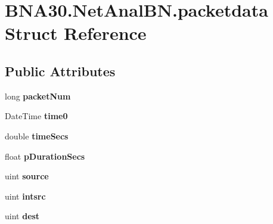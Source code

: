 \hypertarget{struct_b_n_a30_1_1_net_anal_b_n_1_1packetdata}{}\section{B\+N\+A30.\+Net\+Anal\+B\+N.\+packetdata Struct Reference}
\label{struct_b_n_a30_1_1_net_anal_b_n_1_1packetdata}
\subsection*{Public Attributes}
\begin{DoxyCompactItemize}
\item 
\mbox{\label{struct_b_n_a30_1_1_net_anal_b_n_1_1packetdata_a69e68c9039ce3662b36a29dbc50795de}} 
long {\bfseries packet\+Num}
\item 
\mbox{\label{struct_b_n_a30_1_1_net_anal_b_n_1_1packetdata_ae5517e3a1c2d11ba6e1f3b9f1eaeaa0a}} 
Date\+Time {\bfseries time0}
\item 
\mbox{\label{struct_b_n_a30_1_1_net_anal_b_n_1_1packetdata_a3963604c38394f46acf5b608993a3bf5}} 
double {\bfseries time\+Secs}
\item 
\mbox{\label{struct_b_n_a30_1_1_net_anal_b_n_1_1packetdata_ad8cf145e1fefbb8f55be2e3c54c10639}} 
float {\bfseries p\+Duration\+Secs}
\item 
\mbox{\label{struct_b_n_a30_1_1_net_anal_b_n_1_1packetdata_ab71cafc3e4b48c68b2d366e3dba5752d}} 
uint {\bfseries source}
\item 
\mbox{\label{struct_b_n_a30_1_1_net_anal_b_n_1_1packetdata_a8078b5edf20ae5522856290fc153c93c}} 
uint {\bfseries intsrc}
\item 
\mbox{\label{struct_b_n_a30_1_1_net_anal_b_n_1_1packetdata_a517be59e2b2016596df4ac2d198bba3f}} 
uint {\bfseries dest}
\item 
\mbox{\label{struct_b_n_a30_1_1_net_anal_b_n_1_1packetdata_aa21ded03ae240cd44cd0443f3a7ee392}} 

\end{DoxyCompactItemize}

